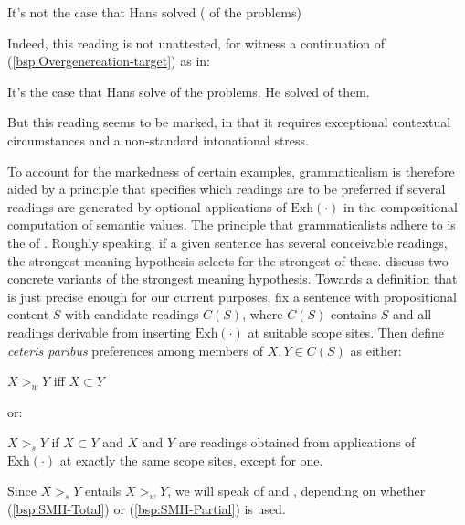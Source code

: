 \documentclass[fleqn,reqno,10pt,draft]{article}
\newcommand{\exh}{\ensuremath{\mathrm{Exh}}}
\begin{document}
\begin{exe}
\ex It's not the case that Hans solved \mymark{$\exh$}( of the problems)
\end{exe}

\noindent Indeed, this reading is not unattested, for witness a
continuation of (\ref{bsp:Overgenereation-target}) as in:
\begin{exe}
\ex \label{bsp:Overgeneration-continued} It's  the case that Hans
  solve  of the problems. He solved
   of them.
\end{exe}

\noindent But this reading seems to be marked, in that it requires
exceptional contextual circumstances and a non-standard intonational
stress.

To account for the markedness of certain examples, grammaticalism is
therefore aided by a principle that specifies which readings are to be
preferred if several readings are generated by optional applications
of $\exh(\cdot)$ in the compositional computation of semantic
values. The principle that grammaticalists adhere to
\citep[c.f.][]{FoxSpector:Economy-and-Emb,ChierchiaFox2008:The-Grammatical,Chierchia2012:FC-Nominals-and}
is the  of
\citet{DalrympleKanazawa1998:Reciprocal-Expr}. Roughly speaking, if a
given sentence has several conceivable readings, the strongest meaning
hypothesis selects for the strongest of
these. \citet{ChierchiaFox2008:The-Grammatical} discuss two concrete
variants of the strongest meaning hypothesis. Towards a definition
that is just precise enough for our current purposes, fix a sentence
with propositional content $S$ with candidate readings $C(S)$, where
$C(S)$ contains $S$ and all readings derivable from inserting
$\exh(\cdot)$ at suitable scope sites.  Then define \emph{ceteris
  paribus} preferences among members of $X,Y \in C(S)$ as either:
\begin{exe}
\ex \label{bsp:SMH-Total} 
  $X >_w Y$ iff $X \subset Y$ 
\end{exe}
or:
\begin{exe}
\ex \label{bsp:SMH-Partial}  $X >_s Y$ if $X \subset Y$ and $X$ and
  $Y$ are readings obtained from applications of $\exh(\cdot)$ at
  exactly the same scope sites, except for one.
\end{exe}
Since $X >_s Y$ entails $X >_w Y$, we will speak of  and , depending on
whether (\ref{bsp:SMH-Total}) or (\ref{bsp:SMH-Partial}) is used.
\end{document}
